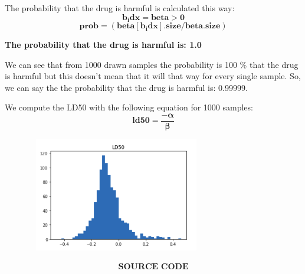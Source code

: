 \documentclass[17pt]{article}
\begin{document}
The probability that the drug is harmful is calculated this way:
$$ \mathbf{b_idx = beta>0} $$
$$ \mathbf{prob = (beta[b_idx].size / beta.size)} $$

\textbf{The probability that the drug is harmful is: 1.0}

We can see that from 1000 drawn samples the probability is 100 \% that the drug is harmful but this doesn't mean that it will that way for every single sample. So, we can say the the probability that the drug is harmful is: 0.99999.

We compute the LD50 with the following equation for 1000 samples:
$$ \mathbf{ld50 = \frac{-\alpha}{\beta}} $$

\begin{center}
\includegraphics[width=10cm, height=5cm]{ld50.png}
\end{center}

\newpage

\begin{align}
\textbf{SOURCE CODE}
\end{align}
\end{document}
